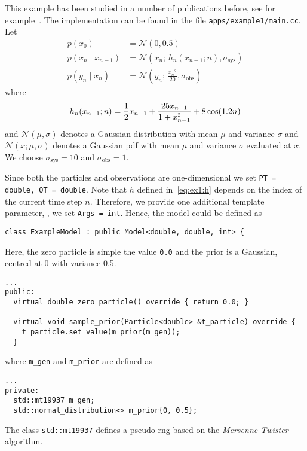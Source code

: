 \begin{example}\label{ex:1}
  This example has been studied in a number of publications before,
  see for example~\cite{arulampalam,gordon,kitagawa}. The
  implementation can be found in the file
  \texttt{apps/example1/main.cc}. Let
  \begin{align*}
    p(x_0) &= \mathcal{N}(0,0.5)\\
    p(x_n \mid x_{n-1}) &= \mathcal{N}(x_n;\, h_n(x_{n-1};n), \sigma_{\text{sys}})\\
    p(y_n \mid x_n) &= \mathcal{N}(y_n;\, \frac{{x_n}^2}{20},
                      \sigma_{\text{obs}})
  \end{align*}
  where
  \begin{equation}
    \label{eq:ex1:h}
    h_n(x_{n-1};n) = \frac{1}{2}x_{n-1} + \frac{25 x_{n-1}}{1 + x_{n-1}^2} + 8 \cos(1.2n) \\
  \end{equation}
  and $\mathcal{N}(\mu, \sigma)$ denotes a Gaussian distribution with
  mean $\mu$ and variance $\sigma$ and $\mathcal{N}(x; \mu, \sigma)$
  denotes a Gaussian pdf with mean $\mu$ and variance $\sigma$
  evaluated at $x$. We choose $\sigma_{\text{sys}} = 10$ and
  $\sigma_{\text{obs}} = 1$.

  Since both the particles and observations are one-dimensional we set
  \texttt{PT = double,\ OT = double}. Note that $h$ defined
  in~\eqref{eq:ex1:h} depends on the index of the current time step
  $n$. Therefore, we provide one additional template parameter, \ie,
  we set \texttt{Args = int}. Hence, the model could be defined as
\begin{verbatim}
class ExampleModel : public Model<double, double, int> {
\end{verbatim}
  Here, the zero particle is simple the value \texttt{0.0} and the
  prior is a Gaussian, centred at 0 with variance 0.5.
\begin{verbatim}
...
public:
  virtual double zero_particle() override { return 0.0; }

  virtual void sample_prior(Particle<double> &t_particle) override {
    t_particle.set_value(m_prior(m_gen));
  }
\end{verbatim}
  where \texttt{m\_gen} and \texttt{m\_prior} are defined as
\begin{verbatim}
...
private:
  std::mt19937 m_gen;
  std::normal_distribution<> m_prior{0, 0.5};
\end{verbatim}
  The class \texttt{std::mt19937} defines a pseudo rng based on the
  \emph{Mersenne Twister} algorithm.


\end{example}
